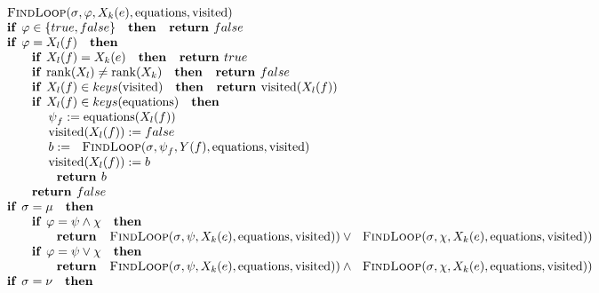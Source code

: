 \begin{equation*}
\begin{array}{l}
\text{\textsc{FindLoop}}(\sigma ,\varphi ,X_{k}(e),\mathrm{equations},%
\mathrm{visited}) \\
\text{\textbf{if }}\varphi \in \{true,false\}\text{ \textbf{then }}\text{%
\textbf{return }}false \\
\text{\textbf{if }}\varphi =X_{l}(f)\text{ \textbf{then }} \\
\qquad \text{\textbf{if }}X_{l}(f)=X_{k}(e)\text{ \textbf{then }}\text{%
\textbf{return }}true \\
\qquad \text{\textbf{if }}\mathrm{rank}(X_{l})\neq \mathrm{rank}(X_{k})\text{
\textbf{then }}\text{\textbf{return }}false \\
\qquad \text{\textbf{if }}X_{l}(f)\in keys(\mathrm{visited})\text{ \textbf{%
then }}\text{\textbf{return }}\mathrm{visited}(X_{l}(f)) \\
\qquad \text{\textbf{if }}X_{l}(f)\in keys(\mathrm{equations})\text{ \textbf{%
then }} \\
\qquad \qquad \psi _{f}:=\mathrm{equations}(X_{l}(f)) \\
\qquad \qquad \mathrm{visited}(X_{l}(f)):=false \\
\qquad \qquad b:=\text{\textsc{FindLoop}}(\sigma ,\psi _{f},Y(f),\mathrm{%
equations},\mathrm{visited}) \\
\qquad \qquad \mathrm{visited}(X_{l}(f)):=b \\
\qquad \qquad \text{\textbf{return }}b \\
\qquad \text{\textbf{return }}false \\
\text{\textbf{if }}\sigma =\mu \text{ \textbf{then }} \\
\qquad \text{\textbf{if }}\varphi =\psi \wedge \chi \text{ \textbf{then }}
\\
\qquad \qquad \text{\textbf{return }}\text{\textsc{FindLoop}}(\sigma ,\psi
,X_{k}(e),\mathrm{equations},\mathrm{visited}))\vee \text{\textsc{FindLoop}}%
(\sigma ,\chi ,X_{k}(e),\mathrm{equations},\mathrm{visited})) \\
\qquad \text{\textbf{if }}\varphi =\psi \vee \chi \text{ \textbf{then }} \\
\qquad \qquad \text{\textbf{return }}\text{\textsc{FindLoop}}(\sigma ,\psi
,X_{k}(e),\mathrm{equations},\mathrm{visited}))\wedge \text{\textsc{FindLoop}%
}(\sigma ,\chi ,X_{k}(e),\mathrm{equations},\mathrm{visited})) \\
\text{\textbf{if }}\sigma =\nu \text{ \textbf{then}} \\

\end{array}
\end{equation*}
